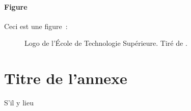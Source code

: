\documentclass [memoire, letterpaper, oneside, fleqn,12pt]{thETS-utf8}
\begin{document}
\subsubsection{Figure}
Ceci est une figure~:
\begin{figure}[h]
  \caption{Logo de l'École de Technologie Supérieure. Tiré de \cite{ETS2010}.}
  \label{fig:logoets}
\end{figure}

%
%
%
%
%
%
%
%

\begin{conclusion}

\end{conclusion}

\begin{remerciements}

\end{remerciements}

\appendix
\multiannexe %
%
\chapter{Titre de l'annexe}
S'il y lieu


\renewcommand{\bibname}{RÉFÉRENCES BIBLIOGRAPHIQUES}

\end{document}
